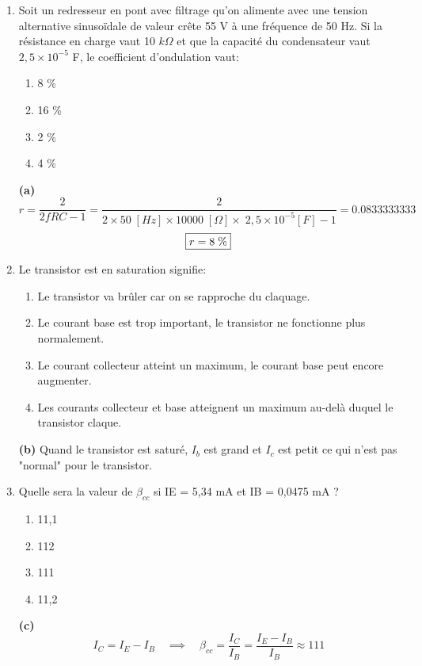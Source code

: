 \documentclass[a4paper]{article}
\begin{document}
\begin{enumerate}
\item Soit un redresseur en pont avec filtrage qu’on alimente avec une tension alternative sinusoïdale de valeur crête 55 V à une fréquence de 50 Hz. Si la résistance en charge vaut 10 $ k \Omega $ et que la capacité du condensateur vaut $ 2,5 \times 10^{-5} $ F, le coefficient d’ondulation vaut:
\begin{enumerate}
    \item 8 \%
    \item 16 \%
    \item 2 \%
    \item 4 \%
\end{enumerate}
\begin{example}
    \textbf{(a)}
    \[
        r = \frac{2}{2 f R C - 1}
        = \frac{2}{2 \times 50 \; [Hz] \times 10000 \; [\Omega] \times \; 2,5 \times 10^{-5} [F] - 1}
        = 0.0833333333
    \]
    \[ \fbox{$\displaystyle r = 8 \; \% $} \]
\end{example}





\item Le transistor est en saturation signifie:
\begin{enumerate}
    \item Le transistor va brûler car on se rapproche du claquage.
    \item Le courant base est trop important, le transistor ne fonctionne plus normalement.
    \item Le courant collecteur atteint un maximum, le courant base peut encore augmenter.
    \item Les courants collecteur et base atteignent un maximum au-delà duquel le transistor claque.
\end{enumerate}
\begin{example}
    \textbf{(b)} Quand le transistor est saturé, $ I_b $ est grand et $ I_c $ est petit ce qui n'est pas "normal" pour le transistor.
\end{example}





\item Quelle sera la valeur de $ \beta_{cc} $ si IE = 5,34 mA et IB = 0,0475 mA ?
\begin{enumerate}
    \item 11,1
    \item 112
    \item 111
    \item 11,2
\end{enumerate}
\begin{example}
    \textbf{(c)}
    \[ 
        I_C = I_E - I_B
        \quad \implies \quad
        \beta_{cc} = \frac{I_C}{I_B} = \frac{I_E - I_B}{I_B} \approx 111
    \]
\end{example}






\end{enumerate}
\end{document}
